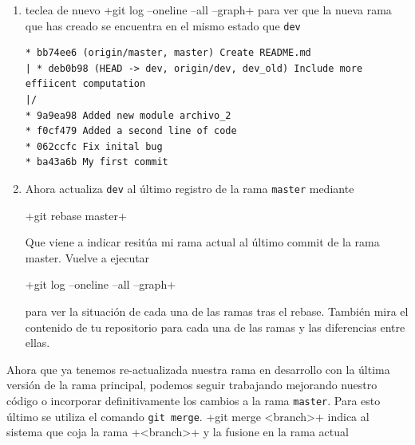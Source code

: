 \documentclass[a5paper,10pt]{article}
\begin{document}
\begin{enumerate}
    \item teclea de nuevo 
    \cverb+git log --oneline --all --graph+
    para ver que la nueva rama que has creado se encuentra en el mismo estado que \verb+dev+
    
    \begin{lstlisting}[style=custom]
* bb74ee6 (origin/master, master) Create README.md
| * deb0b98 (HEAD -> dev, origin/dev, dev_old) Include more effiicent computation
|/  
* 9a9ea98 Added new module archivo_2
* f0cf479 Added a second line of code
* 062ccfc Fix inital bug
* ba43a6b My first commit
    \end{lstlisting}
    
    \item Ahora actualiza \verb+dev+ al último registro de la rama \verb+master+ mediante
    
    \cverb+git rebase master+
    
    Que viene a indicar resitúa mi rama actual al último commit de la rama master. Vuelve a ejecutar 
    
    \cverb+git log --oneline --all --graph+ 
    
    para ver la situación de cada una de las ramas tras el rebase. También mira el contenido de tu repositorio para cada una de las ramas y las diferencias entre ellas.
   
    \end{enumerate}
    
    Ahora que ya tenemos re-actualizada nuestra rama en desarrollo con la última versión de la rama principal, podemos seguir trabajando mejorando nuestro código o incorporar definitivamente los cambios a la rama \verb+master+. Para esto último se utiliza el comando \verb+git merge+. \cverb+git merge <branch>+  indica al sistema que coja la rama \cverb+<branch>+ y la fusione en la rama actual
    
\end{document}
